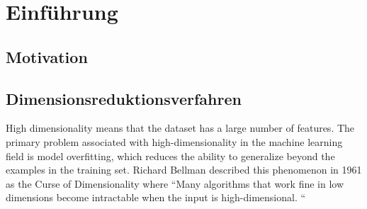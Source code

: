 \chapter{Einführung}

\cite{elad}
\cite{foucart}
\cite{hastie_elements}
\cite{gribonval}
\cite{jenatton}
\cite{johnstone}
\cite{yata}
\cite{mairal}
\cite{tibshirani_lasso}
\cite{tibshirani_uniqueness}
\cite{zou_elasticnet}
\cite{zou_sparsepca}
\cite{zou_overview}
\cite{efron_lars}

\label{introduction}

\section{Motivation}

\section{Dimensionsreduktionsverfahren}

High dimensionality means that the dataset has a large number of features. The primary problem associated with high-dimensionality in the machine learning field is model overfitting, which reduces the ability to generalize beyond the examples in the training set. Richard Bellman described this phenomenon in 1961 as the Curse of Dimensionality where “Many algorithms that work fine in low dimensions become intractable when the input is high-dimensional. “

